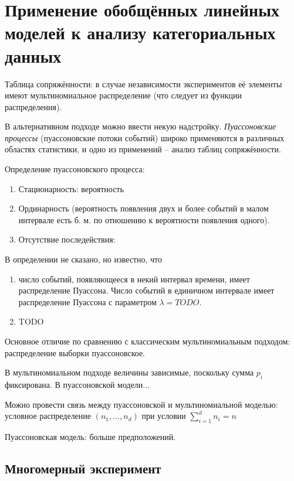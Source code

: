\documentclass[main.tex]{subfiles}
\begin{document}
\section{Применение обобщённых линейных моделей к анализу категориальных данных}

Таблица сопряжённости: в случае независимости экспериментов её элементы имеют мультиномиальное распределение (что следует из функции распределения).

В альтернативном подходе можно ввести некую надстройку.
\emph{Пуассоновские процессы} (пуассоновские потоки событий) широко применяются в различных областях статистики, и одно из применений -- анализ таблиц сопряжённости.

Определение пуассоновского процесса:

\begin{enumerate}[noitemsep]
\item Стационарность: вероятность
\item Ординарность (вероятность появления двух и более событий в малом интервале есть б. м. по отношению к вероятности появления одного).
\item  Отсутствие последействия:
\end{enumerate}

В определении не сказано, но известно, что

\begin{enumerate}[noitemsep]
\item число событий, появляющееся в некий интервал времени, имеет распределение Пуассона.
Число событий в единичном интервале имеет распределение Пуассона с параметром $ \lambda = TODO $.

\item TODO

\end{enumerate}


Основное отличие по сравнению с классическим мультиномиальным подходом: распределение выборки пуассоновское.

В мультиномиальном подходе величины зависимые, поскольку сумма $ p_i $ фиксирована.
В пуассоновской модели...

Можно провести связь между пуассоновской и мультиномиальной моделью: условное распределение $ (n_1, \dots, n_d) $ при условии $ \sum_{i=1}^d n_i = n $

Пуассоновская модель: больше предположений.

\subsection{Многомерный эксперимент}
\end{document}
